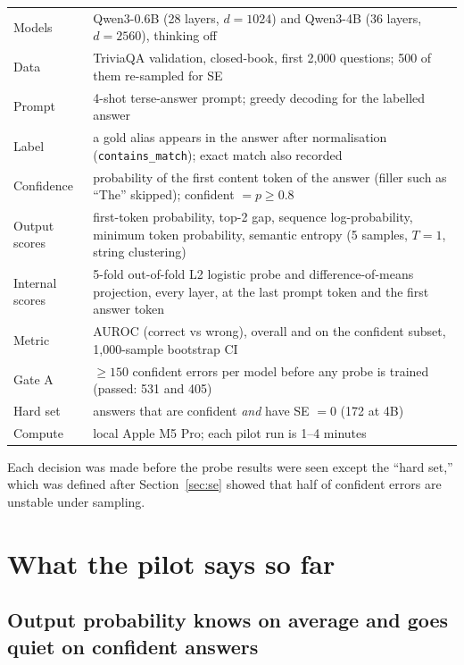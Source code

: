 \documentclass[11pt]{article}
\begin{document}
\begin{table}[H]\centering\small
\begin{tabular}{@{}p{}p{}@{}}
\toprule
Models & Qwen3-0.6B (28 layers, $d=1024$) and Qwen3-4B (36 layers, $d=2560$), thinking off \\
Data & TriviaQA validation, closed-book, first 2{,}000 questions; 500 of them re-sampled for SE \\
Prompt & 4-shot terse-answer prompt; greedy decoding for the labelled answer \\
Label & a gold alias appears in the answer after normalisation (\texttt{contains\_match}); exact match also recorded \\
Confidence & probability of the first content token of the answer (filler such as ``The'' skipped); confident $= p \ge 0.8$ \\
Output scores & first-token probability, top-2 gap, sequence log-probability, minimum token probability, semantic entropy (5 samples, $T{=}1$, string clustering) \\
Internal scores & 5-fold out-of-fold L2 logistic probe and difference-of-means projection, every layer, at the last prompt token and the first answer token \\
Metric & AUROC (correct vs wrong), overall and on the confident subset, 1{,}000-sample bootstrap CI \\
Gate A & $\ge 150$ confident errors per model before any probe is trained (passed: 531 and 405) \\
Hard set & answers that are confident \emph{and} have SE $= 0$ (172 at 4B) \\
Compute & local Apple M5 Pro; each pilot run is 1--4 minutes \\
\bottomrule
\end{tabular}
\end{table}

Each decision was made before the probe results were seen except the ``hard set,'' which was defined after Section~\ref{sec:se} showed that half of confident errors are unstable under sampling.

\section{What the pilot says so far}

\subsection{Output probability knows on average and goes quiet on confident answers}
\end{document}
